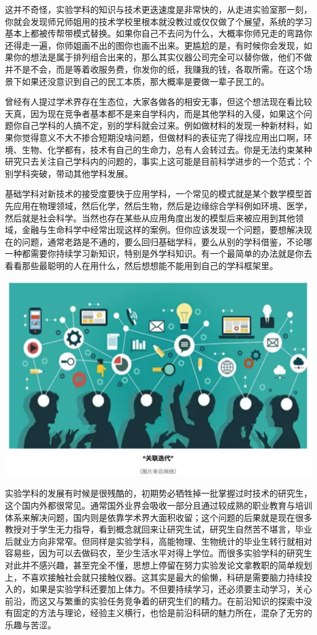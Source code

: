\documentclass[]{book}
\begin{document}
这并不奇怪，实验学科的知识与技术更迭速度是非常快的，从走进实验室那一刻，你就会发现师兄师姐用的技术学校里根本就没教过或仅仅做了个展望，系统的学习基本上都被传帮带模式替换。如果你自己不去问为什么，大概率你师兄走的弯路你还得走一遍，你师姐画不出的图你也画不出来。更尴尬的是，有时候你会发现，如果你的想法是属于排列组合出来的，那么其实仪器公司完全可以替你做，他们不做并不是不会，而是等着收服务费，你发你的纸，我赚我的钱，各取所需。在这个场景下如果还没意识到自己的民工本质，那大概率是要做一辈子民工的。

曾经有人提过学术界存在生态位，大家各做各的相安无事，但这个想法现在看比较天真，因为现在竞争者基本都不是来自学科内，而是其他学科的入侵，如果这个问题你自己学科的人搞不定，别的学科就会过来。例如做材料的发现一种新材料，如果你觉得意义不大不掺合短期没啥问题，但做材料的表征完了得找应用出口啊，环境、生物、化学都有，技术有自己的生命力，总有人会转过去。你是无法约束某种研究只去关注自己学科内的问题的，事实上这可能是目前科学进步的一个范式：个别学科突破，带动其他学科发展。

基础学科对新技术的接受度要快于应用学科，一个常见的模式就是某个数学模型首先应用在物理领域，然后化学，然后生物，然后是边缘综合学科例如环境、医学，然后就是社会科学。当然也存在某些从应用角度出发的模型后来被应用到其他领域，金融与生命科学中经常出现这样的案例。但你应该发现一个问题，要想解决现在的问题，通常老路是不通的，要么回归基础学科，要么从别的学科借鉴，不论哪一种都需要你持续学习新知识，特别是外学科知识。有一个最简单的办法就是你去看看那些最聪明的人在用什么，然后想想能不能用到自己的学科框架里。

\includegraphics[width=6.67in]{images/hhcs5}

实验学科的发展有时候是很残酷的，初期势必牺牲掉一批掌握过时技术的研究生，这个国内外都很常见。通常国外业界会吸收一部分且通过较成熟的职业教育与培训体系来解决问题，国内则是依靠学术界大面积收留；这个问题的后果就是现在很多教授对于学生无力指导，看到概念就回来让研究生试，研究生自然苦不堪言，毕业后就业方向非常窄。但同样是实验学科，高能物理、生物统计的毕业生转行就相对容易些，因为可以去做码农，至少生活水平对得上学位。而很多实验学科的研究生对此并不感兴趣，甚至完全不懂，思想上停留在努力实验发论文拿教职的简单规划上，不喜欢接触社会就只接触仪器。这其实是最大的偷懒，科研是需要脑力持续投入的，如果是实验学科还要加上体力。不但要持续学习，还必须要主动学习，关心前沿，而这又与繁重的实验任务竞争着的研究生们的精力。在前沿知识的探索中没有固定的方法与理论，经验主义横行，也恰是前沿科研的魅力所在，混杂了无穷的乐趣与苦涩。
\end{document}
